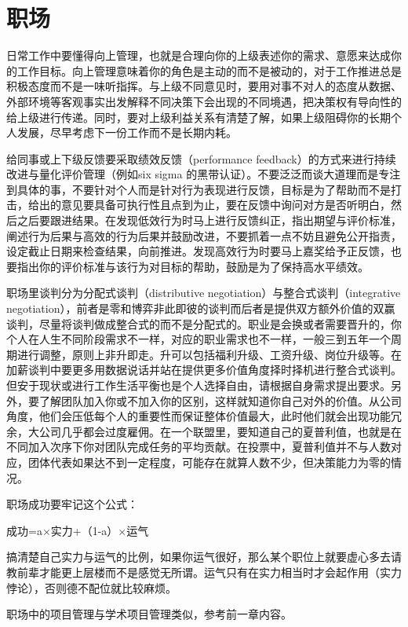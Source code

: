 \documentclass[]{tufte-book}
\begin{document}
\hypertarget{ux804cux573a}{%
\section{职场}\label{ux804cux573a}}

日常工作中要懂得向上管理，也就是合理向你的上级表述你的需求、意愿来达成你的工作目标。向上管理意味着你的角色是主动的而不是被动的，对于工作推进总是积极态度而不是一味听指挥。与上级不同意见时，要用对事不对人的态度从数据、外部环境等客观事实出发解释不同决策下会出现的不同境遇，把决策权有导向性的给上级进行传递。同时，要对上级利益关系有清楚了解，如果上级阻碍你的长期个人发展，尽早考虑下一份工作而不是长期内耗。

给同事或上下级反馈要采取绩效反馈（performance feedback）的方式来进行持续改进与量化评价管理（例如six sigma 的黑带认证）。不要泛泛而谈大道理而是专注到具体的事，不要针对个人而是针对行为表现进行反馈，目标是为了帮助而不是打击，给出的意见要具备可执行性且点到为止，要在反馈中询问对方是否听明白，然后之后要跟进结果。在发现低效行为时马上进行反馈纠正，指出期望与评价标准，阐述行为后果与高效的行为后果并鼓励改进，不要抓着一点不妨且避免公开指责，设定截止日期来检查结果，向前推进。发现高效行为时要马上嘉奖给予正反馈，也要指出你的评价标准与该行为对目标的帮助，鼓励是为了保持高水平绩效。

职场里谈判分为分配式谈判（distributive negotiation）与整合式谈判（integrative negotiation），前者是零和博弈非此即彼的谈判而后者是提供双方额外价值的双赢谈判，尽量将谈判做成整合式的而不是分配式的。职业是会换或者需要晋升的，你个人在人生不同阶段需求不一样，对应的职业需求也不一样，一般三到五年一个周期进行调整，原则上非升即走。升可以包括福利升级、工资升级、岗位升级等。在加薪谈判中要更多用数据说话并站在提供更多价值角度择时择机进行整合式谈判。但安于现状或进行工作生活平衡也是个人选择自由，请根据自身需求提出要求。另外，要了解团队加入你或不加入你的区别，这样就知道你自己对外的价值。从公司角度，他们会压低每个人的重要性而保证整体价值最大，此时他们就会出现功能冗余，大公司几乎都会过度雇佣。在一个联盟里，要知道自己的夏普利值，也就是在不同加入次序下你对团队完成任务的平均贡献。在投票中，夏普利值并不与人数对应，团体代表如果达不到一定程度，可能存在就算人数不少，但决策能力为零的情况。

职场成功要牢记这个公式：

成功=a×实力+（1-a）×运气

搞清楚自己实力与运气的比例，如果你运气很好，那么某个职位上就要虚心多去请教前辈才能更上层楼而不是感觉无所谓。运气只有在实力相当时才会起作用（实力悖论），否则德不配位就比较麻烦。

职场中的项目管理与学术项目管理类似，参考前一章内容。
\end{document}
